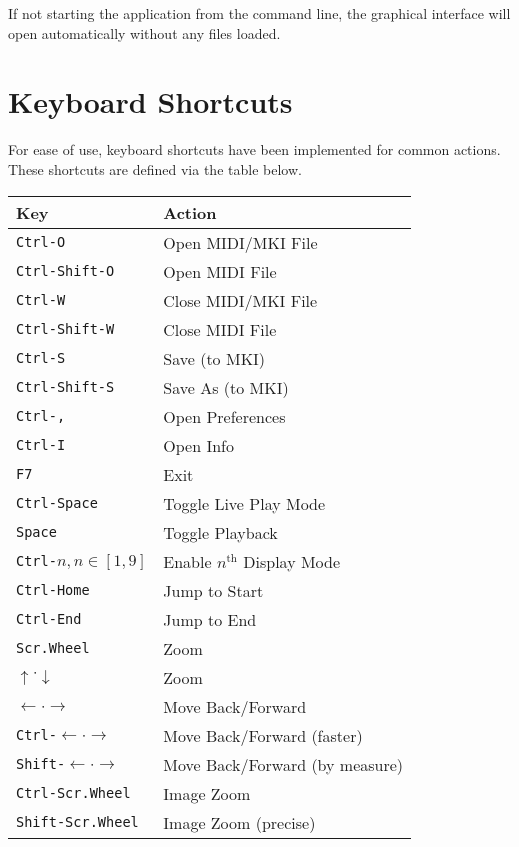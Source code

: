 \documentclass[english]{article}
\makeatletter
\newenvironment{restoretext}%
    {\@parboxrestore%
     \begin{adjustwidth}{}{\leftmargin}%
    }{\end{adjustwidth}
     }
\def\rcbegin{\begin{restoretext}\centering}
\def\rcend{\end{restoretext}}
\providecommand{\mi}[1]{\texttt{#1}}
\makeatother
\begin{document}
If not starting the application from the command line, the graphical interface will open automatically without any files loaded.


\newpage
\section{Keyboard Shortcuts}

For ease of use, keyboard shortcuts have been implemented for common actions. These shortcuts are defined via the table below.

\vspace{1em}

\rcbegin
\begin{tabular}{|l|l|}
  \hline
  \textbf{Key}                 														& \textbf{Action} \\
  \hline
  \mi{Ctrl-O}       					 														& Open MIDI/MKI File \\
  \mi{Ctrl-Shift-O} 					 														& Open MIDI File \\
  \mi{Ctrl-W}       					 														& Close MIDI/MKI File \\
  \mi{Ctrl-Shift-W} 					 														& Close MIDI File \\
  \mi{Ctrl-S}       					 														& Save (to MKI) \\
  \mi{Ctrl-Shift-S} 					 														& Save As (to MKI) \\
  \mi{Ctrl-,}       					 														& Open Preferences \\
  \mi{Ctrl-I}       					 														& Open Info \\
  \mi{F7}       					     														& Exit \\
  \mi{Ctrl-Space}   					 														& Toggle Live Play Mode \\
  \mi{Space}   					 														      & Toggle Playback \\
  \mi{Ctrl-}$n, n \in [1,9]$   														& Enable $n^\text{th}$ Display Mode\\
  \mi{Ctrl-Home}   					 														  & Jump to Start \\
  \mi{Ctrl-End}   					 														  & Jump to End \\
  \mi{Scr.Wheel}       			 										  				& Zoom \\
  $\uparrow \cdot \downarrow$       			                & Zoom \\
  $\leftarrow \cdot \rightarrow$       			              & Move Back/Forward \\
  \mi{Ctrl-}$\leftarrow \cdot \rightarrow$       			    & Move Back/Forward (faster) \\
  \mi{Shift-}$\leftarrow \cdot \rightarrow$       			  & Move Back/Forward (by measure) \\
  \mi{Ctrl-Scr.Wheel}       			 										  	& Image Zoom \\
  \mi{Shift-Scr.Wheel}       			 										  	& Image Zoom (precise) \\
  \hline
\end{tabular}
\rcend
\end{document}
